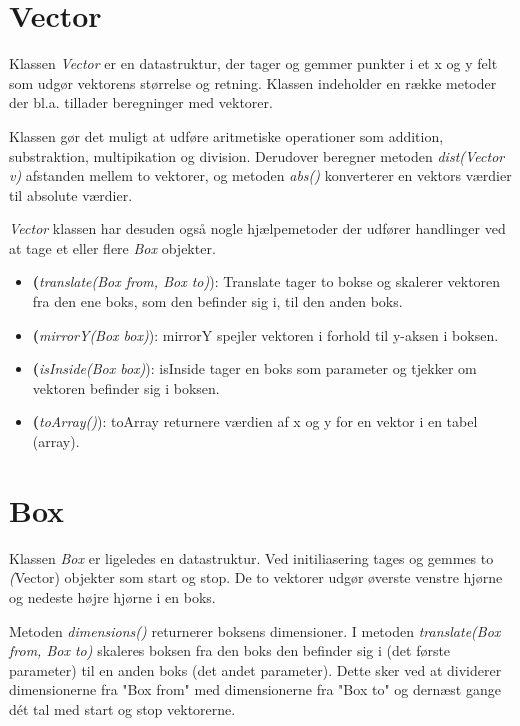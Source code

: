 \section{Vector}

Klassen \emph{Vector} er en datastruktur, der tager og gemmer punkter i et x og y felt som udgør vektorens størrelse og retning. Klassen indeholder en række metoder der bl.a. tillader beregninger med vektorer.

Klassen gør det muligt at udføre aritmetiske operationer som addition, substraktion, multipikation og division. Derudover beregner metoden \emph{dist(Vector v)} afstanden mellem to vektorer, og metoden \emph{abs()} konverterer en vektors værdier til absolute værdier.

\emph{Vector} klassen har desuden også nogle hjælpemetoder der udfører handlinger ved at tage et eller flere \emph{Box} objekter.

\begin{itemize}
	\item \textbf(\emph{translate(Box from, Box to)}): Translate tager to bokse og skalerer vektoren fra den ene boks, som den befinder sig i, til den anden boks.
	\item \textbf(\emph{mirrorY(Box box)}): mirrorY spejler vektoren i forhold til y-aksen i boksen.
	\item \textbf(\emph{isInside(Box box)}): isInside tager en boks som parameter og tjekker om vektoren befinder sig i boksen.
	\item \textbf(\emph{toArray()}): toArray returnere værdien af x og y for en vektor i en tabel (array).
\end{itemize}

\section{Box}

Klassen \emph{Box} er ligeledes en datastruktur. Ved initiliasering tages og gemmes to \emph(Vector) objekter som start og stop. De to vektorer udgør øverste venstre hjørne og nedeste højre hjørne i en boks.

Metoden \emph{dimensions()} returnerer boksens dimensioner. I metoden \emph{translate(Box from, Box to)} skaleres boksen fra den boks den befinder sig i (det første parameter) til en anden boks (det andet parameter). Dette sker ved at dividerer dimensionerne fra "Box from" med dimensionerne fra "Box to" og dernæst gange dét tal med start og stop vektorerne.

